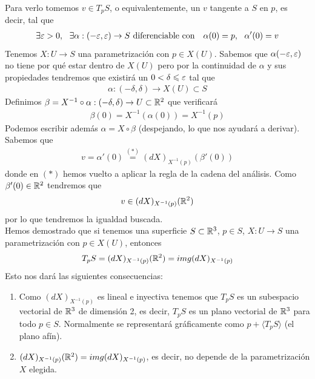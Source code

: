 \begin{observacion}
    Para verlo tomemos $v\in T_pS$, o equivalentemente, un $v$ tangente a $S$ en $p$, es decir, tal que
    \begin{gather*}
        \exists \varepsilon > 0,\ \ \exists \alpha:(-\varepsilon, \varepsilon) \to S\text{ diferenciable con }\ \ \alpha(0)=p,\ \ \alpha'(0)=v
    \end{gather*}
    Tenemos $X:U\to S$ una parametrización con $p\in X(U)$. Sabemos que $\alpha(-\varepsilon, \varepsilon)$ no tiene por qué estar dentro de $X(U)$ pero por la continuidad de $\alpha$ y sus propiedades tendremos que existirá un $0 < \delta \leqslant \varepsilon$ tal que 
    \begin{gather*}
        \alpha : (-\delta, \delta) \to X(U)\subset S
    \end{gather*}
    Definimos $\beta = X^{-1} \circ \alpha : (-\delta, \delta) \to U\subset \mathbb{R}^2$ que verificará
    \begin{gather*}
        \beta(0) = X^{-1}(\alpha(0)) = X^{-1}(p)
    \end{gather*}
    Podemos escribir además $\alpha = X \circ \beta$ (despejando, lo que nos ayudará a derivar). Sabemos que
    \begin{gather*}
        v = \alpha'(0) \overset{(\ast)}{=} (dX)_{X^{-1}(p)}(\beta'(0))
    \end{gather*}
    donde en $(\ast)$ hemos vuelto a aplicar la regla de la cadena del análisis. Como $\beta'(0)\in \mathbb{R}^2$ tendremos que 
    \begin{gather*}
        v \in (dX)_{X^{-1}(p)}(\mathbb{R}^2)
    \end{gather*}
    por lo que tendremos la igualdad buscada.\\

    Hemos demostrado que si tenemos una superficie $S\subset \mathbb{R}^3$, $p\in S$, $X:U\to S$ una parametrización con $p\in X(U)$, entonces 
    \begin{gather*}
        T_pS = (dX)_{X^{-1}(p)}(\mathbb{R}^2) = img(dX)_{X^{-1}(p)}
    \end{gather*}
    Esto nos dará las siguientes consecuencias:
    \begin{enumerate}
        \item Como $(dX)_{X^{-1}(p)}$ es lineal e inyectiva tenemos que $T_pS$ es un subespacio vectorial de $\mathbb{R}^3$ de dimensión 2, es decir, $T_pS$ es un plano vectorial de $\mathbb{R}^3$ para todo $p\in S$. Normalmente se representará gráficamente como $p + \langle T_pS \rangle$ (el plano afín).
        
        \item $(dX)_{X^{-1}(p)}(\mathbb{R}^2) = img(dX)_{X^{-1}(p)}$, es decir, no depende de la parametrización $X$ elegida.
        

\end{enumerate}
\end{observacion}
